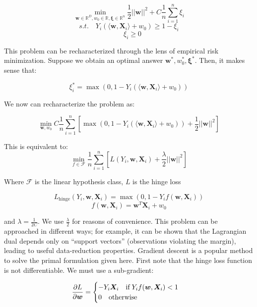 \documentclass{article}
\begin{document}
\begin{equation}
	\min_{\bm{w} \in \mathbb{R}^D, w_0 \in \mathbb{R}, \bm{\xi} \in \mathbb{R}^n} 
	\frac{1}{2} ||\bm{w}||^2 + C \frac{1}{n} \sum_{i=1}^n \xi_i
\end{equation}
$$
s.t. \quad Y_i(\langle \bm{w}, \bm{X}_i \rangle + w_0) \geq 1 - \xi_i 
$$
$$
\quad \xi_i \geq 0 
$$

This problem can be recharacterized through the lens of empirical risk
minimization. Suppose we obtain an optimal answer $\bm{w}^*, w_0^*, \bm{\xi}^*$. 
Then, it makes sense that:

$$
\xi_i^* = \max(0, 1 - Y_i(\langle \bm{w}, \bm{X}_i \rangle + w_0)) 
$$

We now can recharacterize the problem as:

$$
\min_{\bm{w}, w_0} C \frac{1}{n} \sum_{i=1}^n \left[ \max(0, 1 - Y_i(\langle \bm{w},
\bm{X}_i \rangle +
w_0)) + \frac{1}{2}||\bm{w}||^2 \right]
$$

This is equivalent to:
\begin{equation}
\min_{f \in \mathcal{F}} \frac{1}{n} \sum_{i=1}^n \left[ L(Y_i, \bm{w},
	\bm{X}_i) + \frac{\lambda}{2}
||\bm{w}||^2 \right]
\end{equation}

Where $\mathcal{F}$ is the linear hypothesis class, $L$ is the hinge loss

$$
L_{\mathrm{hinge}}(Y_i, \bm{w}, \bm{X}_i) = \max(0, 1 - Y_i
f(\bm{w}, \bm{X}_i))
$$
$$
f(\bm{w}, \bm{X}_i) = \bm{w}^T\bm{X}_i + w_0
$$

and
$\lambda=\frac{1}{2C}$. We use $\frac{\lambda}{2}$ for reasons of
convenience. This problem can be approached in different ways;
for example, it can be shown that the Lagrangian dual depends only on
``support vectors'' (observations violating the margin), leading to useful
data-reduction properties. Gradient descent is a
popular method to solve the primal formulation given here. First note
that the hinge loss function is not differentiable. We must use a sub-gradient:

\begin{equation}
	\frac{\partial L}{\partial \bm{w}} = 
	\begin{cases}
		-Y_i \bm{X}_i \quad \mathrm{if} \hspace{0.2em} Y_if(\bm{w}, \bm{X}_i) < 1\\
		0 \quad \mathrm{otherwise} \\
	\end{cases}
\end{equation}
\end{document}
